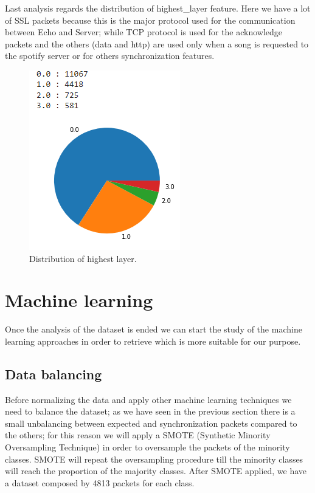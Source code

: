\documentclass[sigconf]{acmart}
\begin{document}
    Last analysis regards the distribution of highest\_layer feature. Here we have a lot of SSL packets because this is the major protocol used for the communication between Echo and Server; while TCP protocol is used for the acknowledge packets and the others (data and http) are used only when a song is requested to the spotify server or for others synchronization features.
    \begin{figure}[h!]
        \includegraphics[width=0.6\linewidth]{img/highest_layer.png}
        \caption{Distribution of highest layer.}
        \label{fig:highest_layer}
    \end{figure}


    \section{Machine learning}
    Once the analysis of the dataset is ended we can start the study of the machine learning approaches in order to retrieve which is more suitable for our purpose.

    \subsection{Data balancing}
    Before normalizing the data and apply other machine learning techniques we need to balance the dataset; as we have seen in the previous section there is a small unbalancing between expected and synchronization packets compared to the others; for this reason we will apply a SMOTE (Synthetic Minority Oversampling Technique) in order to oversample the packets of the minority classes. SMOTE will repeat the oversampling procedure till the minority classes will reach the proportion of the majority classes. After SMOTE applied, we have a dataset composed by 4813 packets for each class.
\end{document}
